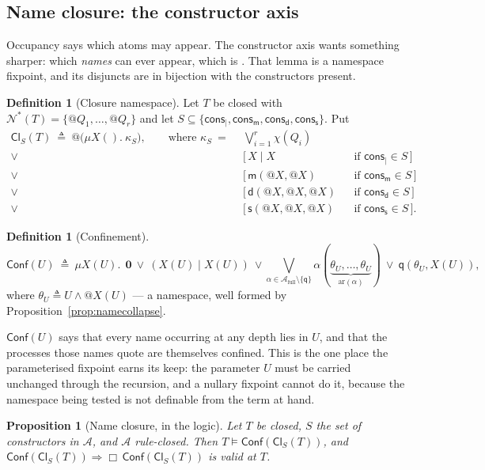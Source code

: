 \documentclass[11pt]{article}
\makeatletter
\theoremstyle{plain}
\newtheorem{proposition}[theorem]{Proposition}
\theoremstyle{definition}
\newtheorem{definition}[theorem]{Definition}
\theoremstyle{remark}
\newcommand{\quo}[1]{@#1}
\newcommand{\nil}{\mathbf{0}}
\newcommand{\nms}[1]{\mathcal{N}^{*}(#1)}
\newcommand{\mm}{\mathsf{m}}
\newcommand{\dd}{\mathsf{d}}
\newcommand{\sy}{\mathsf{s}}
\newcommand{\qq}{\mathsf{q}}
\newcommand{\cons}{\mathsf{cons}}
\newcommand{\consp}{\cons_{\mid}}
\newcommand{\consm}{\cons_{\mm}}
\newcommand{\consd}{\cons_{\dd}}
\newcommand{\conss}{\cons_{\sy}}
\newcommand{\sat}{\models}
\newcommand{\chf}[1]{\chi(#1)}
\newcommand{\Conf}{\mathsf{Conf}}
\newcommand{\Cl}{\mathsf{Cl}}
\newcommand{\Atm}{\mathcal{A}}
\newcommand{\fix}{\mu}
\makeatother
\begin{document}
\subsection{Name closure: the constructor axis}

Occupancy says which atoms may appear. The constructor axis wants something
sharper: which \emph{names} can ever appear, which is
\cite[Lem.~9.1]{rhocomb3}. That lemma is a namespace fixpoint, and its
disjuncts are in bijection with the constructors present.

\begin{definition}[Closure namespace]
\label{def:cl}
Let $T$ be closed with $\nms{T} = \{\quo{Q_1},\dots,\quo{Q_r}\}$ and let
$S \subseteq \{\consp,\consm,\consd,\conss\}$. Put
\begin{align*}
  \Cl_{S}(T) \ \triangleq\ \quo{\big(\fix X().\ \kappa_{S}\big)},
  \qquad \text{where } \kappa_{S} \ =\ \
  & \bigvee_{i=1}^{r} \chf{Q_i}\\
  \vee\ & [\,X \mid X & &\text{if } \consp \in S\,]\\
  \vee\ & [\,\mm(\quo{X},\quo{X}) & &\text{if } \consm \in S\,]\\
  \vee\ & [\,\dd(\quo{X},\quo{X},\quo{X}) & &\text{if } \consd \in S\,]\\
  \vee\ & [\,\sy(\quo{X},\quo{X},\quo{X}) & &\text{if } \conss \in S\,].
\end{align*}
\end{definition}

\begin{definition}[Confinement]
\label{def:conf}
\[
  \Conf(U) \ \triangleq\ \fix X(U).\ \ \nil \ \vee\ (X(U) \mid X(U))
  \ \vee \bigvee_{\alpha \in \Atm_{\mathrm{full}} \setminus \{\qq\}}
    \alpha(\underbrace{\theta_U,\dots,\theta_U}_{\mathrm{ar}(\alpha)})
  \ \vee\ \qq(\theta_U, X(U)),
\]
where $\theta_U \triangleq U \wedge \quo{X(U)}$ --- a namespace, well formed by
Proposition~\ref{prop:namecollapse}.
\end{definition}

$\Conf(U)$ says that every name occurring at any depth lies in $U$, and that the
processes those names quote are themselves confined. This is the one place the
parameterised fixpoint earns its keep: the parameter $U$ must be carried
unchanged through the recursion, and a nullary fixpoint cannot do it, because
the namespace being tested is not definable from the term at hand.

\begin{proposition}[Name closure, in the logic]
\label{prop:nameclosure}
Let $T$ be closed, $S$ the set of constructors in $\Atm$, and $\Atm$ rule-closed.
Then $T \sat \Conf(\Cl_{S}(T))$, and
$\Conf(\Cl_{S}(T)) \Rightarrow \Box\,\Conf(\Cl_{S}(T))$ is valid at $T$.
\end{proposition}
\end{document}
